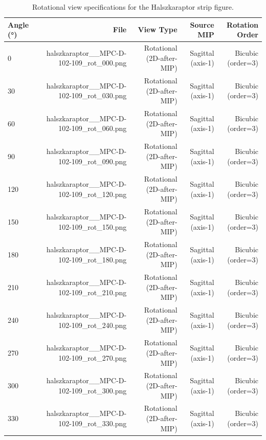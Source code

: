 \begin{table}[htbp]
\caption{Rotational view specifications for the Halszkaraptor strip figure.}
\label{tab:rotational_strip}
\begin{tabular}{lrrrr}
\toprule
Angle (°) & File & View Type & Source MIP & Rotation Order \\
\midrule
0 & halszkaraptor\_\_MPC-D-102-109\_rot\_000.png & Rotational (2D-after-MIP) & Sagittal (axis-1) & Bicubic (order=3) \\
30 & halszkaraptor\_\_MPC-D-102-109\_rot\_030.png & Rotational (2D-after-MIP) & Sagittal (axis-1) & Bicubic (order=3) \\
60 & halszkaraptor\_\_MPC-D-102-109\_rot\_060.png & Rotational (2D-after-MIP) & Sagittal (axis-1) & Bicubic (order=3) \\
90 & halszkaraptor\_\_MPC-D-102-109\_rot\_090.png & Rotational (2D-after-MIP) & Sagittal (axis-1) & Bicubic (order=3) \\
120 & halszkaraptor\_\_MPC-D-102-109\_rot\_120.png & Rotational (2D-after-MIP) & Sagittal (axis-1) & Bicubic (order=3) \\
150 & halszkaraptor\_\_MPC-D-102-109\_rot\_150.png & Rotational (2D-after-MIP) & Sagittal (axis-1) & Bicubic (order=3) \\
180 & halszkaraptor\_\_MPC-D-102-109\_rot\_180.png & Rotational (2D-after-MIP) & Sagittal (axis-1) & Bicubic (order=3) \\
210 & halszkaraptor\_\_MPC-D-102-109\_rot\_210.png & Rotational (2D-after-MIP) & Sagittal (axis-1) & Bicubic (order=3) \\
240 & halszkaraptor\_\_MPC-D-102-109\_rot\_240.png & Rotational (2D-after-MIP) & Sagittal (axis-1) & Bicubic (order=3) \\
270 & halszkaraptor\_\_MPC-D-102-109\_rot\_270.png & Rotational (2D-after-MIP) & Sagittal (axis-1) & Bicubic (order=3) \\
300 & halszkaraptor\_\_MPC-D-102-109\_rot\_300.png & Rotational (2D-after-MIP) & Sagittal (axis-1) & Bicubic (order=3) \\
330 & halszkaraptor\_\_MPC-D-102-109\_rot\_330.png & Rotational (2D-after-MIP) & Sagittal (axis-1) & Bicubic (order=3) \\
\bottomrule
\end{tabular}
\end{table}
